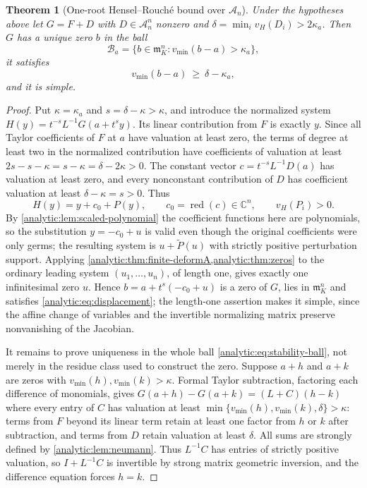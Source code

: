 \documentclass[11pt,letterpaper]{article}
\newtheorem{theorem}{Theorem}[section]
\theoremstyle{definition}
\theoremstyle{remark}
\newcommand{\C}{\mathbb C}
\newcommand{\A}{\mathscr A}
\newcommand{\m}{\mathfrak m}
\newcommand{\red}{\operatorname{red}}
\newcommand{\vH}{v_{\!H}}
\newcommand{\vmin}{v_{\min}}
\numberwithin{equation}{section}
\begin{document}
\begin{theorem}[One-root Hensel--Rouch\'e bound over $\A_n$]
\label{analytic:thm:local-stability}
Under the hypotheses above let $G=F+D$ with $D\in\A_n^n$ nonzero and
$\delta=\min_i\vH(D_i)>2\kappa_a$. Then $G$ has a unique zero $b$ in the
ball
\begin{equation}\label{analytic:eq:stability-ball}
 \mathcal B_a=\{b\in\m_K^n:\vmin(b-a)>\kappa_a\},
\end{equation}
it satisfies
\begin{equation}\label{analytic:eq:displacement}
 \vmin(b-a)\ \ge\ \delta-\kappa_a ,
\end{equation}
and it is simple.
\end{theorem}
\begin{proof}
Put $\kappa=\kappa_a$ and $s=\delta-\kappa>\kappa$, and introduce the
normalized system $H(y)=t^{-s}L^{-1}G(a+t^sy)$. Its linear contribution from
$F$ is exactly $y$. Since all Taylor coefficients of $F$ at $a$ have
valuation at least zero, the terms of degree at least two in the normalized
contribution have coefficients of valuation at least
$2s-s-\kappa=s-\kappa=\delta-2\kappa>0$. The constant vector
$c=t^{-s}L^{-1}D(a)$ has valuation at least zero, and every nonconstant
contribution of $D$ has coefficient valuation at least $\delta-\kappa=s>0$.
Thus
\begin{equation}\label{analytic:eq:normalized-stability}
 H(y)=y+c_0+P(y),\qquad c_0=\red(c)\in\C^n,\qquad\vH(P_i)>0 .
\end{equation}
By \cref{analytic:lem:scaled-polynomial} the coefficient functions here are
polynomials, so the substitution $y=-c_0+u$ is valid even though the
original coefficients were only germs; the resulting system is
$u+\widetilde P(u)$ with strictly positive perturbation support. Applying
\cref{analytic:thm:finite-deformA,analytic:thm:zeros} to the ordinary
leading system $(u_1,\ldots,u_n)$, of length one, gives exactly one
infinitesimal zero $u$. Hence $b=a+t^s(-c_0+u)$ is a zero of $G$, lies in
$\m_K^n$ and satisfies \eqref{analytic:eq:displacement}; the length-one
assertion makes it simple, since the affine change of variables and the
invertible normalizing matrix preserve nonvanishing of the Jacobian.

It remains to prove uniqueness in the whole ball
\eqref{analytic:eq:stability-ball}, not merely in the residue class used to
construct the zero. Suppose $a+h$ and $a+k$ are zeros with
$\vmin(h),\vmin(k)>\kappa$. Formal Taylor subtraction, factoring each
difference of monomials, gives $G(a+h)-G(a+k)=(L+C)(h-k)$ where every entry
of $C$ has valuation at least $\min\{\vmin(h),\vmin(k),\delta\}>\kappa$:
terms from $F$ beyond its linear term retain at least one factor from $h$ or
$k$ after subtraction, and terms from $D$ retain valuation at least
$\delta$. All sums are strongly defined by
\cref{analytic:lem:neumann}. Thus $L^{-1}C$ has entries of strictly positive
valuation, so $I+L^{-1}C$ is invertible by strong matrix geometric
inversion, and the difference equation forces $h=k$.
\end{proof}
\end{document}
